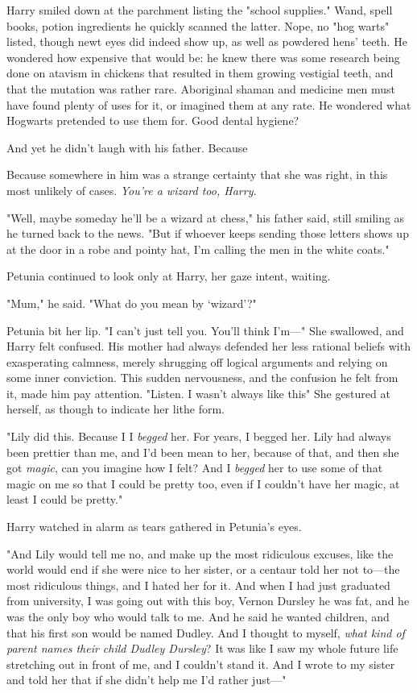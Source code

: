 Harry smiled down at the parchment listing the "school
supplies." Wand, spell books, potion ingredients{\el} he quickly
scanned the latter. Nope, no "hog warts" listed, though
newt eyes did indeed show up, as well as powdered hens'
teeth. He wondered how expensive that would be: he
knew there was some research being done on atavism in
chickens that resulted in them growing vestigial teeth, and
that the mutation was rather rare. Aboriginal shaman and
medicine men must have found plenty of uses for it, or
imagined them at any rate. He wondered what Hogwarts
pretended to use them for. Good dental hygiene?

And yet he didn't laugh with his father. Because{\el}

Because somewhere in him was a strange certainty that
she was right, in this most unlikely of cases.
\emph{You're a wizard too, Harry.}

"Well, maybe someday he'll be a wizard at chess," his
father said, still smiling as he turned back to the news.
"But if whoever keeps sending those letters shows up at
the door in a robe and pointy hat, I'm calling the men in
the white coats."

Petunia continued to look only at Harry, her gaze intent,
waiting.

"Mum," he said. "What do you mean by `wizard'?"

Petunia bit her lip. "I can't just tell you. You'll think I'm—"
She swallowed, and Harry felt confused. His mother had
always defended her less rational beliefs with
exasperating calmness, merely shrugging off logical arguments
and relying on some inner conviction. This sudden
nervousness, and the confusion he felt from it, made him
pay attention. "Listen. I wasn't{\el} always like this{\el}" She
gestured at herself, as though to indicate her lithe form.

"Lily did this. Because I{\el} I \emph{begged} her. For years, I
begged her. Lily had always been prettier than me, and
I'd{\el} been mean to her, because of that, and then she
got \emph{magic}, can you imagine how I felt? And I \emph{begged} her
to use some of that magic on me so that I could be
pretty too, even if I couldn't have her magic, at least I
could be pretty."

Harry watched in alarm as tears gathered in Petunia's eyes.

"And Lily would tell me no, and make up the most
ridiculous excuses, like the world would end if she were
nice to her sister, or a centaur told her not to—the most
ridiculous things, and I hated her for it. And when I had
just graduated from university, I was going out with this
boy, Vernon Dursley{\el} he was fat, and he was the only boy
who would talk to me. And he said he wanted children,
and that his first son would be named Dudley. And I
thought to myself, \emph{what kind of parent names their child
Dudley Dursley}? It was like I saw my whole future life
stretching out in front of me, and I couldn't stand it. And
I wrote to my sister and told her that if she didn't help
me I'd rather just—"

